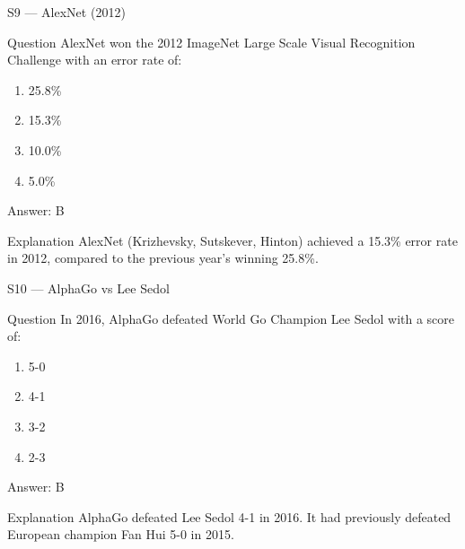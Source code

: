 \documentclass[aspectratio=169,8pt]{beamer}
\begin{document}
	\begin{frame}{S9 --- AlexNet (2012)}
		\begin{block}{Question}
			AlexNet won the 2012 ImageNet Large Scale Visual Recognition Challenge with an error rate of:
			\begin{enumerate}
				\item 25.8\%
				\item 15.3\%
				\item 10.0\%
				\item 5.0\%
			\end{enumerate}
		\end{block}
		\begin{exampleblock}{Answer: B}\end{exampleblock}
		\begin{block}{Explanation}
			AlexNet (Krizhevsky, Sutskever, Hinton) achieved a 15.3\% error rate in 2012, compared to the previous year's winning 25.8\%.
		\end{block}
	\end{frame}
	
	\begin{frame}{S10 --- AlphaGo vs Lee Sedol}
		\begin{block}{Question}
			In 2016, AlphaGo defeated World Go Champion Lee Sedol with a score of:
			\begin{enumerate}
				\item 5-0
				\item 4-1
				\item 3-2
				\item 2-3
			\end{enumerate}
		\end{block}
		\begin{exampleblock}{Answer: B}\end{exampleblock}
		\begin{block}{Explanation}
			AlphaGo defeated Lee Sedol 4-1 in 2016. It had previously defeated European champion Fan Hui 5-0 in 2015.
		\end{block}
	\end{frame}
	
\end{document}
